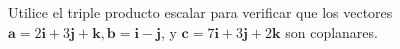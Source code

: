 \item Utilice el triple producto escalar para verificar que los vectores $\mathbf{a} = 2\mathbf{i} + 3\mathbf{j} + \mathbf{k}, \mathbf{b} = \mathbf{i} - \mathbf{j}$, y $\mathbf{c} = 7\mathbf{i} + 3\mathbf{j} + 2\mathbf{k}$ son coplanares.
